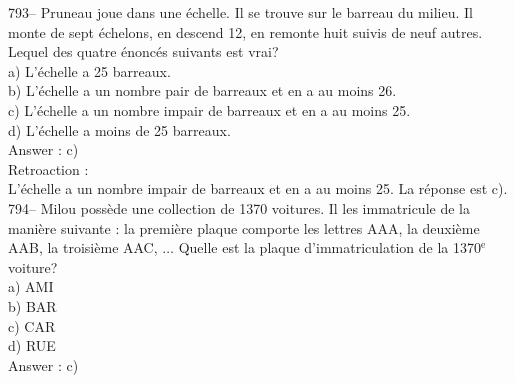 ﻿\documentclass[letterpaper, 12pt]{article}
\begin{document}
793-- Pruneau joue dans une \'echelle.  Il se trouve sur le barreau du
milieu.  Il monte de sept \'echelons, en descend 12, en remonte huit suivis
de neuf autres.  Lequel des quatre \'enonc\'es suivants est vrai?\\
a) L'\'echelle a 25 barreaux.\\
b) L'\'echelle a un nombre pair de barreaux et en a au moins 26.\\
c) L'\'echelle a un nombre impair de barreaux et en a au moins 25.\\
d) L'\'echelle a moins de 25 barreaux.\\

Answer : c)\\

Retroaction : \\
L'\'echelle a un nombre impair de barreaux et en a au moins 25.  La
r\'eponse est c).\\

794-- Milou poss\`ede une collection de 1370 voitures.  Il les immatricule
de la mani\`ere suivante : la premi\`ere plaque comporte les lettres AAA, la
deuxi\`eme AAB, la troisi\`eme AAC, $\ldots$  Quelle est la plaque
d'immatriculation de la 1370$^{\textrm{e}}$ voiture?\\
a) AMI\\
b) BAR\\
c) CAR\\
d) RUE\\

Answer : c)\\
\end{document}
